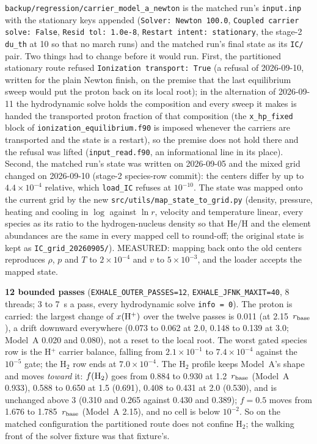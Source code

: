 \documentclass[english,a4paper]{my_memo}
\begin{document}
\texttt{backup/regression/carrier\_model\_a\_newton} is the matched run's
\texttt{input.inp} with the stationary keys appended (\texttt{Solver: Newton
100.0}, \texttt{Coupled carrier solve: False}, \texttt{Resid tol: 1.0e-8},
\texttt{Restart intent: stationary}, the stage-2 \texttt{du\_th} at 10 so
that no march runs) and the matched run's final state as its \texttt{IC/}
pair. Two things had to change before it would run. First, the partitioned
stationary route refused \texttt{Ionization transport: True} (a refusal of
2026-09-10, written for the plain Newton finish, on the premise that the last
equilibrium sweep would put the proton back on its local root); in the
alternation of 2026-09-11 the hydrodynamic solve holds the composition and
every sweep it makes is handed the transported proton fraction of that
composition (the \texttt{x\_hp\_fixed} block of
\texttt{ionization\_equilibrium.f90} is imposed whenever the carriers are
transported and the state is a restart), so the premise does not hold there
and the refusal was lifted (\texttt{input\_read.f90}, an informational line
in its place). Second, the matched run's state was written on 2026-09-05 and
the mixed grid changed on 2026-09-10 (stage-2 species-row commit): the
centers differ by up to $4.4\times10^{-4}$ relative, which
\texttt{load\_IC} refuses at $10^{-10}$. The state was mapped onto the
current grid by the new \texttt{src/utils/map\_state\_to\_grid.py}
(density, pressure, heating and cooling in $\log$ against $\ln r$, velocity
and temperature linear, every species as its ratio to the hydrogen-nucleus
density so that He/H and the element abundances are the same in every mapped
cell to round-off; the original state is kept as \texttt{IC\_grid\_20260905/}).
MEASURED: mapping back onto the old centers reproduces $\rho$, $p$ and $T$
to $2\times10^{-4}$ and $v$ to $5\times10^{-3}$, and the loader accepts the
mapped state.

\textbf{12 bounded passes} (\texttt{EXHALE\_OUTER\_PASSES=12},
\texttt{EXHALE\_JFNK\_MAXIT=40}, 8 threads; 3 to 7~s a pass, every
hydrodynamic solve \texttt{info = 0}). The proton is carried: the largest
change of $x({\rm H}^+)$ over the twelve passes is 0.011 (at
2.15~$r_{\rm base}$), a drift downward everywhere (0.073 to 0.062 at 2.0,
0.148 to 0.139 at 3.0; Model~A 0.020 and 0.080), not a reset to the local
root. The worst gated species row is the H$^+$ carrier balance, falling
from $2.1\times10^{-1}$ to $7.4\times10^{-4}$ against the $10^{-5}$ gate;
the H$_2$ row ends at $7.0\times10^{-4}$. The H$_2$ profile keeps Model~A's
shape and moves \emph{toward} it: $f({\rm H}_2)$ goes from 0.884 to 0.930
at 1.2~$r_{\rm base}$ (Model~A 0.933), 0.588 to 0.650 at 1.5 (0.691), 0.408
to 0.431 at 2.0 (0.530), and is unchanged above 3 (0.310 and 0.265 against
0.430 and 0.389); $f = 0.5$ moves from 1.676 to 1.785~$r_{\rm base}$ (Model~A
2.15), and no cell is below $10^{-2}$. So on the matched configuration the
partitioned route does not confine H$_2$; the walking front of the solver
fixture was that fixture's.
\end{document}
